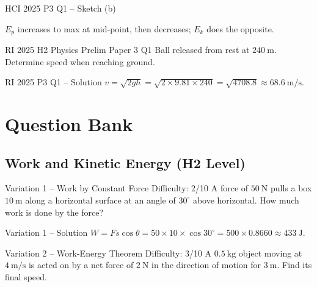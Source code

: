 \documentclass[11pt]{beamer}
\begin{document}
\begin{frame}{HCI 2025 P3 Q1 – Sketch (b)}
\begin{center}
\end{center}
$E_p$ increases to max at mid‑point, then decreases; $E_k$ does the opposite.
\end{frame}

\begin{frame}[shrink=15]{RI 2025 H2 Physics Prelim Paper 3 Q1}
Ball released from rest at $240\ \mathrm{m}$. Determine speed when reaching ground.
\end{frame}

\begin{frame}{RI 2025 P3 Q1 – Solution}
$v = \sqrt{2gh} = \sqrt{2\times9.81\times240} = \sqrt{4708.8} \approx 68.6\ \mathrm{m/s}$.
\end{frame}

\section{Question Bank}

\subsection{Work and Kinetic Energy (H2 Level)}

\begin{frame}[shrink=15]{Variation 1 – Work by Constant Force \hfill Difficulty: 2/10}
A force of $50\ \mathrm{N}$ pulls a box $10\ \mathrm{m}$ along a horizontal surface at an angle of $30^\circ$ above horizontal. How much work is done by the force?
\end{frame}

\begin{frame}{Variation 1 – Solution}
$W = F s \cos\theta = 50 \times 10 \times \cos30^\circ = 500 \times 0.8660 \approx 433\ \mathrm{J}$.
\end{frame}

\begin{frame}[shrink=15]{Variation 2 – Work-Energy Theorem \hfill Difficulty: 3/10}
A $0.5\ \mathrm{kg}$ object moving at $4\ \mathrm{m/s}$ is acted on by a net force of $2\ \mathrm{N}$ in the direction of motion for $3\ \mathrm{m}$. Find its final speed.
\end{frame}
\end{document}
